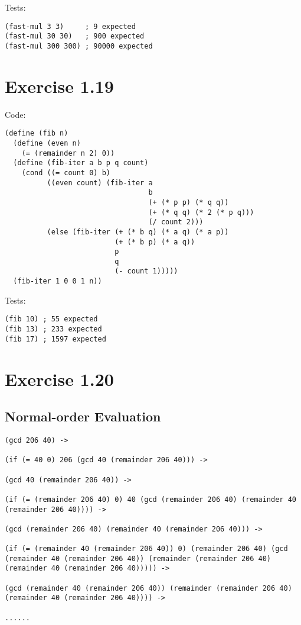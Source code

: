 \documentclass[../main.tex]{subfiles}
\begin{document}
Tests:

\begin{lstlisting}
(fast-mul 3 3)     ; 9 expected
(fast-mul 30 30)   ; 900 expected
(fast-mul 300 300) ; 90000 expected
\end{lstlisting}

\section{Exercise 1.19}

Code:

\begin{lstlisting}
(define (fib n)
  (define (even n)
    (= (remainder n 2) 0))
  (define (fib-iter a b p q count)
    (cond ((= count 0) b)
          ((even count) (fib-iter a
                                  b
                                  (+ (* p p) (* q q))
                                  (+ (* q q) (* 2 (* p q)))
                                  (/ count 2)))
          (else (fib-iter (+ (* b q) (* a q) (* a p))
                          (+ (* b p) (* a q))
                          p
                          q
                          (- count 1)))))
  (fib-iter 1 0 0 1 n))
\end{lstlisting}

Tests:

\begin{lstlisting}
(fib 10) ; 55 expected
(fib 13) ; 233 expected
(fib 17) ; 1597 expected
\end{lstlisting}

\section{Exercise 1.20}

\subsection*{Normal-order Evaluation}

\begin{lstlisting}
(gcd 206 40) ->

(if (= 40 0) 206 (gcd 40 (remainder 206 40))) ->

(gcd 40 (remainder 206 40)) ->

(if (= (remainder 206 40) 0) 40 (gcd (remainder 206 40) (remainder 40 (remainder 206 40)))) ->

(gcd (remainder 206 40) (remainder 40 (remainder 206 40))) ->

(if (= (remainder 40 (remainder 206 40)) 0) (remainder 206 40) (gcd (remainder 40 (remainder 206 40)) (remainder (remainder 206 40) (remainder 40 (remainder 206 40))))) ->

(gcd (remainder 40 (remainder 206 40)) (remainder (remainder 206 40) (remainder 40 (remainder 206 40)))) ->

......
\end{lstlisting}
\end{document}
